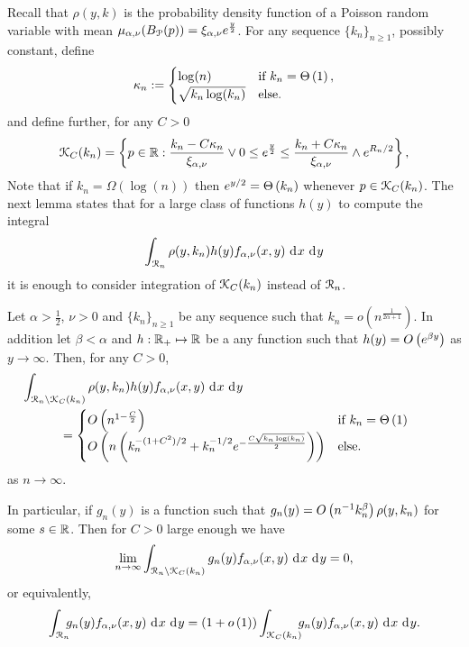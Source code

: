 Recall that $\rho(y, k)$ is the probability density function of a Poisson random variable with mean $\mu_{\alpha, \nu}(B_{{\mathcal P}}(p)) = \xi_{\alpha,\nu}e^{\frac{y}{2}}$. 
For any sequence $\{k_n\}_{n \ge 1}$, possibly constant, define
\begin{equation}\label{eq:def_kappa_n}
	\kappa_n := \begin{cases}
		\log(n) &\mbox{if } k_n = \Theta\left(1\right),\\
		\sqrt{k_n \log(k_n)} &\mbox{else.}
	\end{cases}
\end{equation}
and define further, for any $C > 0$
\begin{equation}\label{eq:def_K_C_set}
	{\mathcal K}_C(k_n) = \left\{p \in {\ensuremath{\mathbb R}} : \frac{k_n - C \kappa_n}{\xi_{\alpha,\nu}} \vee 0 \le e^{\frac{y}{2}}
	\le \frac{k_n + C \kappa_n}{\xi_{\alpha,\nu}} \wedge e^{R_n/2} \right\},
\end{equation}
Note that if $k_n = \Omega(\log(n))$ then $e^{y/2} = \Theta\left(k_n\right)$ whenever $p \in {\mathcal K}_C(k_n)$. The next lemma states that for a large class of functions $h(y)$ to compute the integral 
\[
	\int_{{\mathcal R}_n} \rho(y,k_n) h(y) f_{\alpha,\nu}(x,y) \operatorname{\, \mathrm{d}\hspace{-1pt}} x \operatorname{\, \mathrm{d}\hspace{-1pt}} y
\]
it is enough to consider integration of ${\mathcal K}_C(k_n)$ instead of ${\mathcal R}_n$.

\begin{lemma}\label{lem:concentration_argument}
Let $\alpha > \frac{1}{2}$, $\nu > 0$ and $\{k_n\}_{n \ge 1}$ be any sequence such that $k_n = o(n^{\frac{1}{2\alpha + 1}})$. In addition let $\beta < \alpha$ and $h : {\mathbb R}_+ \mapsto {\ensuremath{\mathbb R}}$ be a any function such that $h(y) = O\left(e^{\beta y}\right)$ as $y \to \infty$. Then, for any $C > 0$,
\begin{equation}\label{eq:error_bound_int_rho_not_K}
\begin{aligned}
	&\hspace{-30pt} \int_{\Rcal_n \setminus \Kcal_{C}(k_n)} \rho(y,k_n) h(y) f_{\alpha,\nu}(x,y) \dd x \dd y\\
	&= \begin{cases}
		\bigO{n^{1 - \frac{C}{2}}} &\mbox{if } k_n = \bigT{1} \\
		\bigO{n \left(k_n^{-(1+C^2)/2} + k_n^{-1/2} e^{-\frac{C\sqrt{k_n \log(k_n)}}{2}}\right)} &\mbox{else.}
	\end{cases}
\end{aligned}
\end{equation}
as $n \to \infty$. 

In particular, if $g_n(y)$ is a function such that $g_n(y) = O\left(n^{-1} k_n^{\beta}\right)\rho(y,k_n)$ for some $s \in {\ensuremath{\mathbb R}}$. Then for $C > 0$ large enough we have
\[
	\lim_{n \to \infty} \int_{{\mathcal R}_n \setminus {\mathcal K}_{C}(k_n)} g_n(y) f_{\alpha,\nu}(x,y) \operatorname{\, \mathrm{d}\hspace{-1pt}} x\operatorname{\, \mathrm{d}\hspace{-1pt}} y = 0,
\]
or equivalently,
\[
	\int_{{\mathcal R}_n} \hspace{-5pt} g_n(y) f_{\alpha,\nu}(x,y) \operatorname{\, \mathrm{d}\hspace{-1pt}} x \operatorname{\, \mathrm{d}\hspace{-1pt}} y
	= (1+o\left(1\right)) \int_{{\mathcal K}_{C}(k_n)} \hspace{-5pt} g_n(y) f_{\alpha,\nu}(x,y) \operatorname{\, \mathrm{d}\hspace{-1pt}} x \operatorname{\, \mathrm{d}\hspace{-1pt}} y.
\]
\end{lemma}

